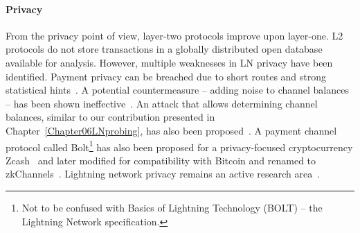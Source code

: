 \paragraph{Privacy}
From the privacy point of view, layer-two protocols improve upon layer-one.
L2 protocols do not store transactions in a globally distributed open database available for analysis.
However, multiple weaknesses in LN privacy have been identified.
Payment privacy can be breached due to short routes and strong statistical hints~\cite{Beres2019}.
A potential countermeasure -- adding noise to channel balances -- has been shown ineffective~\cite{Tang2019}.
An attack that allows determining channel balances, similar to our contribution presented in Chapter~\ref{Chapter06LNprobing}, has also been proposed~\cite{HerreraJoancomarti2019}.
A payment channel protocol called Bolt\footnote{Not to be confused with Basics of Lightning Technology (BOLT) -- the Lightning Network specification.} has also been proposed for a privacy-focused cryptocurrency Zcash~\cite{Green2017} and later modified for compatibility with Bitcoin and renamed to zkChannels~\cite{Akinyele2020}.
Lightning network privacy remains an active research area~\cite{Malavolta2017, Kohen2019, Tang2020, Rohrer2020, Kappos2020}.


